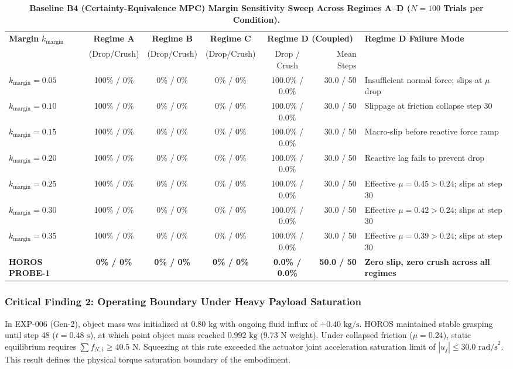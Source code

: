 \begin{table}[t]
\centering
\caption{\textbf{Baseline B4 (Certainty-Equivalence MPC) Margin Sensitivity Sweep Across Regimes A--D ($N=100$ Trials per Condition).}}
\label{tab:b4_sensitivity}
\small
\begin{tabular}{lccccrl}
\toprule
\textbf{Margin} $k_{\text{margin}}$ & \textbf{Regime A} & \textbf{Regime B} & \textbf{Regime C} & \multicolumn{2}{c}{\textbf{Regime D (Coupled)}} & \textbf{Regime D Failure Mode} \\
\cmidrule(lr){5-6}
& (Drop/Crush) & (Drop/Crush) & (Drop/Crush) & Drop / Crush & Mean Steps & \\
\midrule
$k_{\text{margin}} = 0.05$ & 100\% / 0\% & 0\% / 0\% & 0\% / 0\% & 100.0\% / 0.0\% & 30.0 / 50 & Insufficient normal force; slips at $\mu$ drop \\
$k_{\text{margin}} = 0.10$ & 100\% / 0\% & 0\% / 0\% & 0\% / 0\% & 100.0\% / 0.0\% & 30.0 / 50 & Slippage at friction collapse step 30 \\
$k_{\text{margin}} = 0.15$ & 100\% / 0\% & 0\% / 0\% & 0\% / 0\% & 100.0\% / 0.0\% & 30.0 / 50 & Macro-slip before reactive force ramp \\
$k_{\text{margin}} = 0.20$ & 100\% / 0\% & 0\% / 0\% & 0\% / 0\% & 100.0\% / 0.0\% & 30.0 / 50 & Reactive lag fails to prevent drop \\
$k_{\text{margin}} = 0.25$ & 100\% / 0\% & 0\% / 0\% & 0\% / 0\% & 100.0\% / 0.0\% & 30.0 / 50 & Effective $\mu=0.45 > 0.24$; slips at step 30 \\
$k_{\text{margin}} = 0.30$ & 100\% / 0\% & 0\% / 0\% & 0\% / 0\% & 100.0\% / 0.0\% & 30.0 / 50 & Effective $\mu=0.42 > 0.24$; slips at step 30 \\
$k_{\text{margin}} = 0.35$ & 100\% / 0\% & 0\% / 0\% & 0\% / 0\% & 100.0\% / 0.0\% & 30.0 / 50 & Effective $\mu=0.39 > 0.24$; slips at step 30 \\
\midrule
\textbf{HOROS PROBE-1} & \textbf{0\% / 0\%} & \textbf{0\% / 0\%} & \textbf{0\% / 0\%} & \textbf{0.0\% / 0.0\%} & \textbf{50.0 / 50} & \textbf{Zero slip, zero crush across all regimes} \\
\bottomrule
\end{tabular}
\end{table}

\subsubsection{Critical Finding 2: Operating Boundary Under Heavy Payload Saturation}
In EXP-006 (Gen-2), object mass was initialized at $0.80\text{ kg}$ with ongoing fluid influx of $+0.40\text{ kg/s}$. HOROS maintained stable grasping until step 48 ($t = 0.48\text{ s}$), at which point object mass reached $0.992\text{ kg}$ ($9.73\text{ N}$ weight). Under collapsed friction ($\mu = 0.24$), static equilibrium requires $\sum f_{N, i} \ge 40.5\text{ N}$. Squeezing at this rate exceeded the actuator joint acceleration saturation limit of $|u_j| \le 30.0\text{ rad/s}^2$. This result defines the physical torque saturation boundary of the embodiment.


